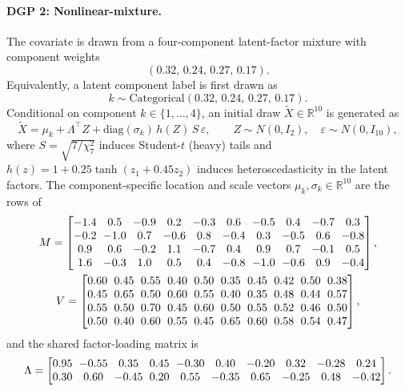 \documentclass[11pt]{article}
\theoremstyle{statplain}
\theoremstyle{statdefinition}
\newcommand{\0}{\mathbf{0}}
\begin{document}
\paragraph{DGP 2: Nonlinear-mixture.}
The covariate is drawn from a four-component latent-factor mixture with component weights
\[
(0.32,\, 0.24,\, 0.27,\, 0.17).
\]
Equivalently, a latent component label is first drawn as
\[
k \sim \mathrm{Categorical}(0.32,\, 0.24,\, 0.27,\, 0.17).
\]
Conditional on component $k\in\{1,\ldots, 4\}$, an initial draw $\widetilde{X}\in\mathbb{R}^{10}$ is generated as
\[
\widetilde{X} = \mu_k + \Lambda^\top Z + \mathrm{diag}(\sigma_k)\, h(Z)\, S\, \varepsilon,
\qquad
Z \sim N(0, I_2),
\quad
\varepsilon \sim N(0, I_{10}),
\]
where $S = \sqrt{7/\chi^2_7}$ induces Student-$t$ (heavy) tails and $h(z) = 1 + 0.25\tanh(z_1 + 0.45 z_2)$ induces heteroscedasticity in the latent factors. The component-specific location and scale vectors $\mu_k, \sigma_k \in \mathbb{R}^{10}$ are the rows of
{\small
\begin{gather*}
\setlength{\arraycolsep}{3pt}
M =
\begin{bmatrix}
-1.4 & 0.5 & -0.9 & 0.2 & -0.3 & 0.6 & -0.5 & 0.4 & -0.7 & 0.3 \\
-0.2 & -1.0 & 0.7 & -0.6 & 0.8 & -0.4 & 0.3 & -0.5 & 0.6 & -0.8 \\
0.9 & 0.6 & -0.2 & 1.1 & -0.7 & 0.4 & 0.9 & 0.7 & -0.1 & 0.5 \\
1.6 & -0.3 & 1.0 & 0.5 & 0.4 & -0.8 & -1.0 & -0.6 & 0.9 & -0.4
\end{bmatrix},
\\
\setlength{\arraycolsep}{3pt}
V =
\begin{bmatrix}
0.60 & 0.45 & 0.55 & 0.40 & 0.50 & 0.35 & 0.45 & 0.42 & 0.50 & 0.38 \\
0.45 & 0.65 & 0.50 & 0.60 & 0.55 & 0.40 & 0.35 & 0.48 & 0.44 & 0.57 \\
0.55 & 0.50 & 0.70 & 0.45 & 0.60 & 0.50 & 0.55 & 0.52 & 0.46 & 0.50 \\
0.50 & 0.40 & 0.60 & 0.55 & 0.45 & 0.65 & 0.60 & 0.58 & 0.54 & 0.47
\end{bmatrix},
\end{gather*}
}%
and the shared factor-loading matrix is
{\small
\[
\setlength{\arraycolsep}{3pt}
\Lambda =
\begin{bmatrix}
0.95 & -0.55 & 0.35 & 0.45 & -0.30 & 0.40 & -0.20 & 0.32 & -0.28 & 0.24 \\
0.30 & 0.60 & -0.45 & 0.20 & 0.55 & -0.35 & 0.65 & -0.25 & 0.48 & -0.42
\end{bmatrix}.
\]
}%
\end{document}
